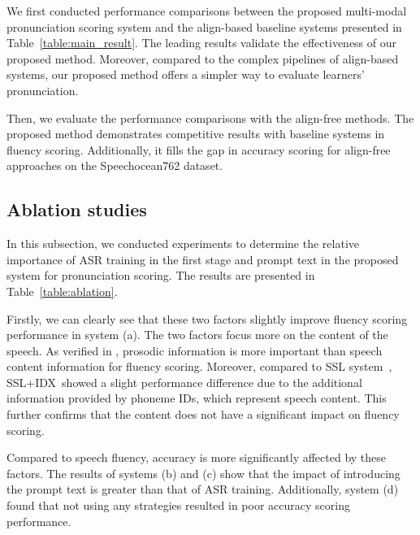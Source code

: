 We first conducted performance comparisons between the proposed multi-modal pronunciation scoring system and the align-based baseline systems presented in Table~\ref{table:main_result}. The leading results validate the effectiveness of our proposed method.
Moreover, compared to the complex pipelines of align-based systems, our proposed method offers a simpler way to evaluate learners' pronunciation. 

Then, we evaluate the performance comparisons with the align-free methods. The proposed method demonstrates competitive results with baseline systems in fluency scoring. Additionally, it fills the gap in accuracy scoring for align-free approaches on the Speechocean762 dataset.











\subsection{Ablation studies}
In this subsection, we conducted experiments to determine the relative importance of ASR training in the first stage and prompt text in the proposed system for pronunciation scoring. The results are presented in Table~\ref{table:ablation}.

Firstly, we can clearly see that these two factors slightly improve fluency scoring performance in system (a). The two factors focus more on the content of the speech. As verified in \cite{our1,our2}, prosodic information is more important than speech content information for fluency scoring. Moreover, compared to SSL system~\cite{ssl1}, SSL+IDX~\cite{liuwei}showed a slight performance difference due to the additional information provided by phoneme IDs, which represent speech content. This further confirms that the content does not have a significant impact on fluency scoring.

Compared to speech fluency, accuracy is more significantly affected by these factors. The results of systems (b) and (c) show that the impact of introducing the prompt text is greater than that of ASR training. Additionally, system (d) found that not using any strategies resulted in poor accuracy scoring performance.

